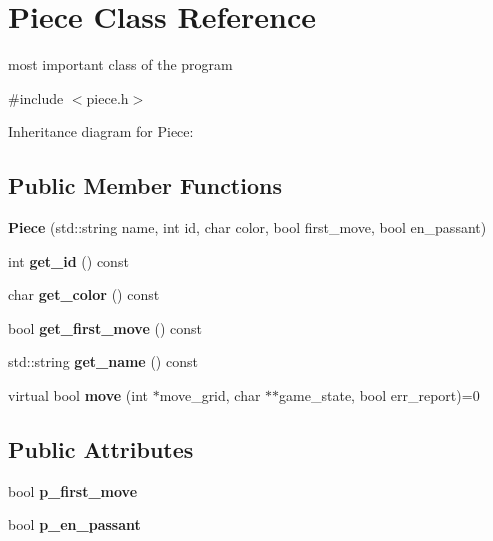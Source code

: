 \hypertarget{classPiece}{}\section{Piece Class Reference}
\label{classPiece}


most important class of the program  




{\ttfamily \#include $<$piece.\+h$>$}



Inheritance diagram for Piece\+:
\subsection*{Public Member Functions}
\begin{DoxyCompactItemize}
\item 
\mbox{\label{classPiece_acbe47e24bee09b8cc562a2bcd1424c51}} 
{\bfseries Piece} (std\+::string name, int id, char color, bool first\+\_\+move, bool en\+\_\+passant)
\item 
\mbox{\label{classPiece_a236697193d2add8d3872aa8b6813ce79}} 
int {\bfseries get\+\_\+id} () const
\item 
\mbox{\label{classPiece_a5a18c08757a0eccdc6fd0686d4db6743}} 
char {\bfseries get\+\_\+color} () const
\item 
\mbox{\label{classPiece_a22d040f3742f7f8ac12dce9eccb0cbfe}} 
bool {\bfseries get\+\_\+first\+\_\+move} () const
\item 
\mbox{\label{classPiece_a1a1e76a6069d2f906a5b8a2b95c97338}} 
std\+::string {\bfseries get\+\_\+name} () const
\item 
\mbox{\label{classPiece_a9749102d6c0dc65fbf95e1c705ee12fd}} 
virtual bool {\bfseries move} (int $\ast$move\+\_\+grid, char $\ast$$\ast$game\+\_\+state, bool err\+\_\+report)=0
\end{DoxyCompactItemize}
\subsection*{Public Attributes}
\begin{DoxyCompactItemize}
\item 
\mbox{\label{classPiece_a55834ea9d4700a0bccf9bad6cbd84b75}} 
bool {\bfseries p\+\_\+first\+\_\+move}
\item 
\mbox{\label{classPiece_adacb14fe5026a05e95c9c25471842232}} 
bool {\bfseries p\+\_\+en\+\_\+passant}
\end{DoxyCompactItemize}


